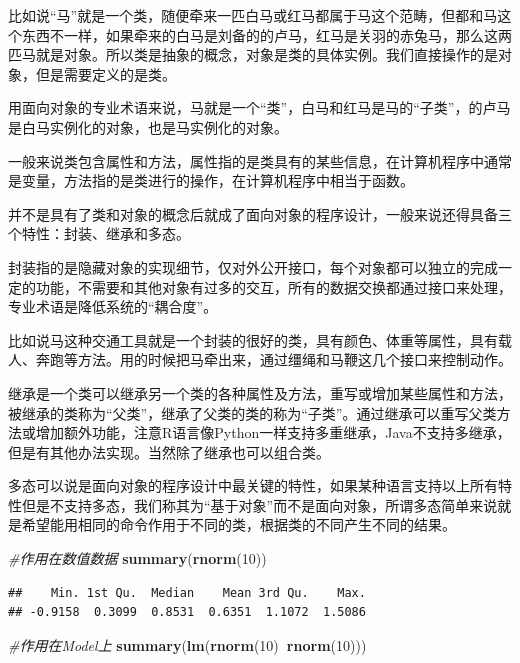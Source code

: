 \documentclass[]{book}
\newenvironment{Shaded}{\begin{snugshade}}{\end{snugshade}}
\newcommand{\KeywordTok}[1]{\textcolor[rgb]{0.13,0.29,0.53}{\textbf{#1}}}
\newcommand{\DecValTok}[1]{\textcolor[rgb]{0.00,0.00,0.81}{#1}}
\newcommand{\CommentTok}[1]{\textcolor[rgb]{0.56,0.35,0.01}{\textit{#1}}}
\newcommand{\OperatorTok}[1]{\textcolor[rgb]{0.81,0.36,0.00}{\textbf{#1}}}
\newcommand{\NormalTok}[1]{#1}
\begin{document}
比如说``马''就是一个类，随便牵来一匹白马或红马都属于马这个范畴，但都和马这个东西不一样，如果牵来的白马是刘备的的卢马，红马是关羽的赤兔马，那么这两匹马就是对象。所以类是抽象的概念，对象是类的具体实例。我们直接操作的是对象，但是需要定义的是类。

用面向对象的专业术语来说，马就是一个``类''，白马和红马是马的``子类''，的卢马是白马实例化的对象，也是马实例化的对象。

一般来说类包含属性和方法，属性指的是类具有的某些信息，在计算机程序中通常是变量，方法指的是类进行的操作，在计算机程序中相当于函数。

并不是具有了类和对象的概念后就成了面向对象的程序设计，一般来说还得具备三个特性：封装、继承和多态。

封装指的是隐藏对象的实现细节，仅对外公开接口，每个对象都可以独立的完成一定的功能，不需要和其他对象有过多的交互，所有的数据交换都通过接口来处理，专业术语是降低系统的``耦合度''。

比如说马这种交通工具就是一个封装的很好的类，具有颜色、体重等属性，具有载人、奔跑等方法。用的时候把马牵出来，通过缰绳和马鞭这几个接口来控制动作。

继承是一个类可以继承另一个类的各种属性及方法，重写或增加某些属性和方法，被继承的类称为``父类''，继承了父类的类的称为``子类''。通过继承可以重写父类方法或增加额外功能，注意R语言像Python一样支持多重继承，Java不支持多继承，但是有其他办法实现。当然除了继承也可以组合类。

多态可以说是面向对象的程序设计中最关键的特性，如果某种语言支持以上所有特性但是不支持多态，我们称其为``基于对象''而不是面向对象，所谓多态简单来说就是希望能用相同的命令作用于不同的类，根据类的不同产生不同的结果。

\begin{Shaded}
\begin{Highlighting}[]
\CommentTok{#作用在数值数据}
\KeywordTok{summary}\NormalTok{(}\KeywordTok{rnorm}\NormalTok{(}\DecValTok{10}\NormalTok{))}
\end{Highlighting}
\end{Shaded}

\begin{verbatim}
##    Min. 1st Qu.  Median    Mean 3rd Qu.    Max. 
## -0.9158  0.3099  0.8531  0.6351  1.1072  1.5086
\end{verbatim}

\begin{Shaded}
\begin{Highlighting}[]
\CommentTok{#作用在Model上}
\KeywordTok{summary}\NormalTok{(}\KeywordTok{lm}\NormalTok{(}\KeywordTok{rnorm}\NormalTok{(}\DecValTok{10}\NormalTok{)}\OperatorTok{~}\KeywordTok{rnorm}\NormalTok{(}\DecValTok{10}\NormalTok{)))}
\end{Highlighting}
\end{Shaded}
\end{document}
